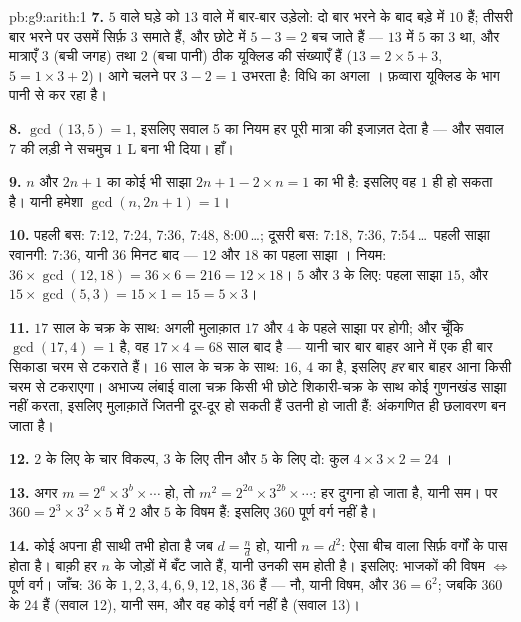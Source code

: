 \begin{solution}{pb:g9:arith:1}
\textbf{7.} $5$ वाले घड़े को $13$ वाले में बार-बार उड़ेलो: दो बार भरने
के बाद बड़े में $10$ हैं; तीसरी बार भरने पर उसमें सिर्फ़ $3$ समाते हैं,
और छोटे में $5 - 3 = 2$ बच जाते हैं --- $13$ में $5$ का  $3$
था, और मात्राएँ $3$ (बची जगह) तथा $2$ (बचा पानी) ठीक यूक्लिड की
संख्याएँ हैं ($13 = 2 \times 5 + 3$, $5 = 1 \times 3 + 2$)। आगे चलने
पर $3 - 2 = 1$ उभरता है: विधि का अगला । फ़व्वारा यूक्लिड के भाग
पानी से कर रहा है।

\textbf{8.} $\gcd(13, 5) = 1$, इसलिए सवाल 5 का नियम हर पूरी मात्रा की
इजाज़त देता है --- और सवाल 7 की लड़ी ने सचमुच $1$ L बना भी दिया। हाँ।

\textbf{9.} $n$ और $2n + 1$ का कोई भी साझा 
$2n + 1 - 2 \times n = 1$ का भी  है: इसलिए वह $1$ ही हो सकता है।
यानी हमेशा $\gcd(n, 2n+1) = 1$।

\textbf{10.} पहली बस: 7:12, 7:24, 7:36, 7:48, 8:00\,\dots; दूसरी बस:
7:18, 7:36, 7:54\,\dots\ पहली साझा रवानगी: 7:36, यानी $36$ मिनट बाद
--- $12$ और $18$ का पहला साझा । नियम:
$36 \times \gcd(12, 18) = 36 \times 6 = 216 = 12 \times
18$। $5$ और $3$ के लिए: पहला साझा  $15$, और
$15 \times \gcd(5,3) = 15 \times 1 = 15 = 5 \times 3$।

\textbf{11.} $17$ साल के चक्र के साथ: अगली मुलाक़ात $17$ और $4$ के
पहले साझा  पर होगी; और चूँकि $\gcd(17, 4) = 1$ है, वह
$17 \times 4 = 68$ साल बाद है --- यानी चार बार बाहर आने में एक ही बार
सिकाडा चरम से टकराते हैं। $16$ साल के चक्र के साथ: $16$, $4$ का 
है, इसलिए \emph{हर} बार बाहर आना किसी चरम से टकराएगा। अभाज्य लंबाई
वाला चक्र किसी भी छोटे शिकारी-चक्र के साथ कोई गुणनखंड साझा नहीं करता,
इसलिए मुलाक़ातें जितनी दूर-दूर हो सकती हैं उतनी हो जाती हैं: अंकगणित
ही छलावरण बन जाता है।

\textbf{12.} $2$ के लिए  के चार विकल्प, $3$ के लिए तीन और $5$
के लिए दो: कुल $4 \times 3 \times 2 = 24$ ।

\textbf{13.} अगर $m = 2^{a} \times 3^{b} \times \cdots$ हो, तो
$m^2 = 2^{2a} \times 3^{2b} \times \cdots$: हर  दुगना हो जाता
है, यानी सम। पर $360 = 2^3 \times 3^2 \times 5$ में $2$ और $5$ के
 विषम हैं: इसलिए $360$ पूर्ण वर्ग नहीं है।

\textbf{14.} कोई  अपना ही साथी तभी होता है जब $d = \frac nd$ हो,
यानी $n = d^2$: ऐसा बीच वाला  सिर्फ़ वर्गों के पास होता है। बाक़ी
हर $n$ के  जोड़ों में बँट जाते हैं, यानी उनकी  सम होती है।
इसलिए: भाजकों की विषम  $\Leftrightarrow$ पूर्ण वर्ग। जाँच: $36$
के  $1, 2, 3, 4, 6, 9, 12, 18, 36$ हैं --- नौ, यानी विषम, और
$36 = 6^2$; जबकि $360$ के $24$  हैं (सवाल 12), यानी सम, और वह
कोई वर्ग नहीं है (सवाल 13)।


\end{solution}
